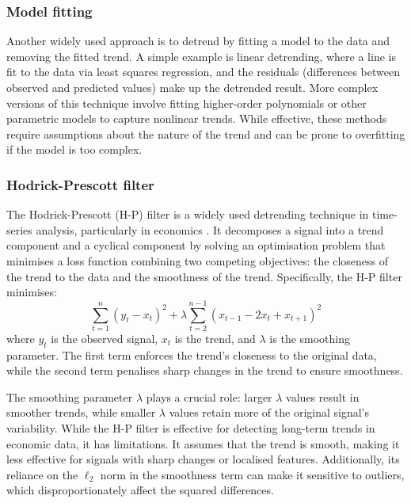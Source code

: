 \subsubsection{Model fitting}
Another widely used approach is to detrend by fitting a model to the data and removing the fitted trend. A simple example is linear detrending, where a line is fit to the data via least squares regression, and the residuals (differences between observed and predicted values) make up the detrended result. More complex versions of this technique involve fitting higher-order polynomials or other parametric models to capture nonlinear trends. While effective, these methods require assumptions about the nature of the trend and can be prone to overfitting if the model is too complex.

\subsubsection{Hodrick-Prescott filter}
The Hodrick-Prescott (H-P) filter is a widely used detrending technique in time-series analysis, particularly in economics \cite{hodrick_postwar_1997}. It decomposes a signal into a trend component and a cyclical component by solving an optimisation problem that minimises a loss function combining two competing objectives: the closeness of the trend to the data and the smoothness of the trend. Specifically, the H-P filter minimises:
\begin{equation}
    \sum_{t=1}^n (y_t - x_t)^2 + \lambda \sum_{t=2}^{n-1} (x_{t-1} - 2x_t + x_{t+1})^2
\end{equation}
where $y_t$ is the observed signal, $x_t$ is the trend, and $\lambda$ is the smoothing parameter. The first term enforces the trend's closeness to the original data, while the second term penalises sharp changes in the trend to ensure smoothness.

The smoothing parameter $\lambda$ plays a crucial role: larger $\lambda$ values result in smoother trends, while smaller $\lambda$ values retain more of the original signal's variability. While the H-P filter is effective for detecting long-term trends in economic data, it has limitations. It assumes that the trend is smooth, making it less effective for signals with sharp changes or localised features. Additionally, its reliance on the $\ell_2$ norm in the smoothness term can make it sensitive to outliers, which disproportionately affect the squared differences.

